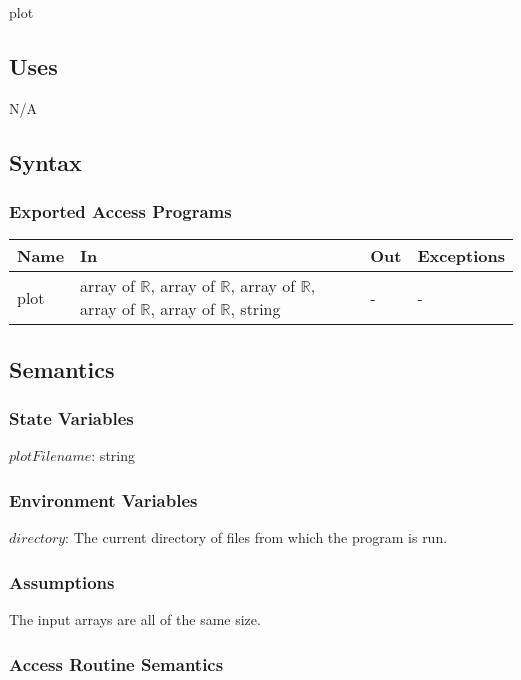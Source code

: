 \documentclass[12pt]{article}
\begin{document}
plot

\subsection{Uses}

N/A

\subsection{Syntax}

\subsubsection{Exported Access Programs}

\begin{center}
\begin{tabular}{p{2cm} p{8cm} p{2cm} p{2cm}}
\hline
\textbf{Name} & \textbf{In} & \textbf{Out} & \textbf{Exceptions} \\
\hline
plot & array of $\mathbb{R}$, array of $\mathbb{R}$, array of $\mathbb{R}$, array of $\mathbb{R}$, array of $\mathbb{R}$, string & - & - \\
\hline
\end{tabular}
\end{center}

\subsection{Semantics}

\subsubsection{State Variables}

$plotFilename$: string

\subsubsection{Environment Variables}

$directory$: The current directory of files from which the program is run.

\subsubsection{Assumptions}

The input arrays are all of the same size.

\subsubsection{Access Routine Semantics}
\end{document}
